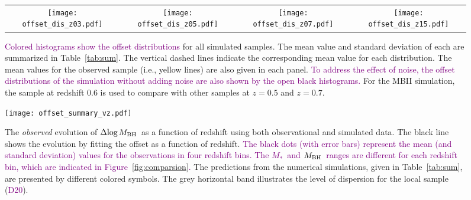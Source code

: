 \documentclass[twocolumn]{aastex631}
\newcommand{\red}[1]{\textcolor{purple}{#1}}
\def\smass{{$M_*$}}
\def\mbh{$M_{\rm BH}$}
\begin{document}
\begin{figure*}
\centering
\begin{tabular}{c c c c}
\hspace*{-0.4cm} 
{\texttt{[image: offset\_dis\_z03.pdf]}}&
\hspace*{-0.4cm} 
{\texttt{[image: offset\_dis\_z05.pdf]}}&
\hspace*{-0.4cm} 
{\texttt{[image: offset\_dis\_z07.pdf]}}&
\hspace*{-0.4cm} 
{\texttt{[image: offset\_dis\_z15.pdf]}}\\
\end{tabular}
\caption{\label{fig:offsets} 
\red{Colored histograms show the offset distributions} for all simulated samples. The mean value and standard deviation of each are summarized in Table~\ref{tab:sum}. The vertical dashed lines indicate the corresponding mean value for each distribution. The mean values for the observed sample (i.e., yellow lines) are also given in each panel. \red{To address the effect of noise, the offset distributions of the simulation without adding noise are also shown by the open black histograms.}
For the MBII simulation, the sample at redshift 0.6 is used to compare with other samples at $z=0.5$ and $z=0.7$. 
}
\end{figure*} 


\begin{figure}
\centering
\texttt{[image: offset\_summary\_vz.pdf]}
\caption{\label{fig:offsets_vz} 
The {\it observed} evolution of $\Delta{\rm log}$\mbh\ as a function of redshift using both observational and simulated data. The black line shows the evolution by fitting the offset as a function of redshift. \red{The black dots (with error bars) represent the mean (and standard deviation) values for the observations in four redshift bins. The \smass\ and \mbh\ ranges are different for each redshift bin, which are indicated in Figure~\ref{fig:comparsion}.} The predictions from the numerical simulations, given in Table~\ref{tab:sum}, are presented by different colored symbols. The grey horizontal band illustrates the level of dispersion for the local sample (\red{D20}).
}
\end{figure} 
\end{document}
